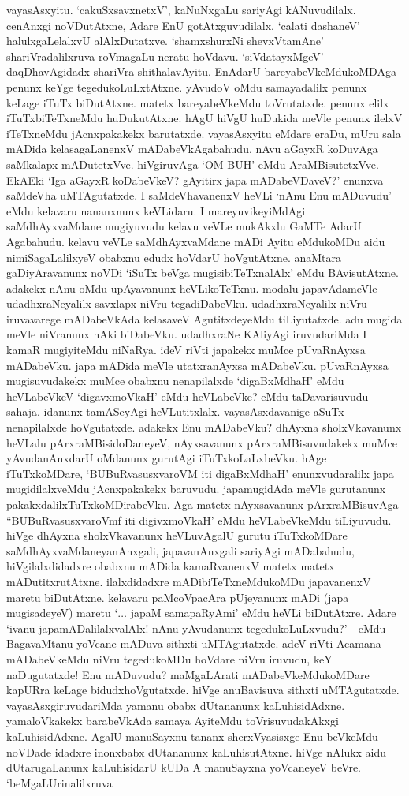 vayasAsxyitu. `cakuSxsavxnetxV', kaNuNxgaLu sariyAgi kANuvudilalx. cenAnxgi noVDutAtxne, Adare EnU gotAtxguvudilalx. `calati dashaneV' halulxgaLelalxvU alAlxDutatxve. `shamxshurxNi shevxVtamAne' shariVradalilxruva roVmagaLu neratu hoVdavu. `siVdatayxMgeV' daqDhavAgidadx shariVra shithalavAyitu. EnAdarU bareyabeVkeMdukoMDAga penunx keYge tegedukoLuLxtAtxne. yAvudoV oMdu samayadalilx penunx keLage iTuTx biDutAtxne. matetx bareyabeVkeMdu toVrutatxde. penunx elilx iTuTxbiTeTxneMdu huDukutAtxne. hAgU hiVgU huDukida meVle penunx ilelxV iTeTxneMdu jAcnxpakakekx barutatxde. vayasAsxyitu eMdare eraDu, mUru sala mADida kelasagaLanenxV mADabeVkAgabahudu. nAvu aGayxR koDuvAga saMkalapx mADutetxVve. hiVgiruvAga `OM BUH' eMdu AraMBisutetxVve. EkAEki `Iga aGayxR koDabeVkeV? gAyitirx japa mADabeVDaveV?' enunxva saMdeVha uMTAgutatxde. I saMdeVhavanenxV heVLi `nAnu Enu mADuvudu' eMdu kelavaru nananxnunx keVLidaru. I mareyuvikeyiMdAgi saMdhAyxvaMdane mugiyuvudu kelavu veVLe mukAkxlu GaMTe AdarU Agabahudu. kelavu veVLe saMdhAyxvaMdane mADi Ayitu eMdukoMDu aidu nimiSagaLalilxyeV obabxnu edudx hoVdarU hoVgutAtxne. anaMtara gaDiyAravanunx noVDi `iSuTx beVga mugisibiTeTxnalAlx' eMdu BAvisutAtxne. adakekx nAnu oMdu upAyavanunx heVLikoTeTxnu. modalu japavAdameVle udadhxraNeyalilx savxlapx niVru tegadiDabeVku. udadhxraNeyalilx niVru iruvavarege mADabeVkAda kelasaveV AgutitxdeyeMdu tiLiyutatxde. adu mugida meVle niVranunx hAki biDabeVku. udadhxraNe KAliyAgi iruvudariMda I kamaR mugiyiteMdu niNaRya. ideV riVti japakekx muMce pUvaRnAyxsa mADabeVku. japa mADida meVle utatxranAyxsa mADabeVku. pUvaRnAyxsa mugisuvudakekx muMce obabxnu nenapilalxde `digaBxMdhaH' eMdu heVLabeVkeV `digavxmoVkaH' eMdu heVLabeVke? eMdu taDavarisuvudu sahaja. idanunx tamASeyAgi heVLutitxlalx. vayasAsxdavanige aSuTx nenapilalxde hoVgutatxde. adakekx Enu mADabeVku? dhAyxna sholxVkavanunx heVLalu pArxraMBisidoDaneyeV, nAyxsavanunx pArxraMBisuvudakekx muMce yAvudanAnxdarU oMdanunx gurutAgi iTuTxkoLaLxbeVku. hAge iTuTxkoMDare, `BUBuRvasusxvaroVM iti digaBxMdhaH' enunxvudaralilx japa mugidilalxveMdu jAcnxpakakekx baruvudu. japamugidAda meVle gurutanunx pakakxdalilxTuTxkoMDirabeVku. Aga matetx nAyxsavanunx pArxraMBisuvAga ``BUBuRvasusxvaroVmf iti digivxmoVkaH' eMdu heVLabeVkeMdu tiLiyuvudu. hiVge dhAyxna sholxVkavanunx heVLuvAgalU gurutu iTuTxkoMDare saMdhAyxvaMdaneyanAnxgali, japavanAnxgali sariyAgi mADabahudu, hiVgilalxdidadxre obabxnu mADida kamaRvanenxV matetx matetx mADutitxrutAtxne. ilalxdidadxre mADibiTeTxneMdukoMDu japavanenxV maretu biDutAtxne. kelavaru paMcoVpacAra pUjeyanunx mADi (japa mugisadeyeV) maretu `$\ldots$ japaM samapaRyAmi' eMdu heVLi biDutAtxre. Adare `ivanu japamADalilalxvalAlx! nAnu yAvudanunx tegedukoLuLxvudu?' - eMdu BagavaMtanu yoVcane mADuva sithxti uMTAgutatxde. adeV riVti Acamana mADabeVkeMdu niVru tegedukoMDu hoVdare niVru iruvudu, keY naDugutatxde! Enu mADuvudu? maMgaLArati mADabeVkeMdukoMDare kapURra keLage bidudxhoVgutatxde. hiVge anuBavisuva sithxti uMTAgutatxde. vayasAsxgiruvudariMda yamanu obabx dUtananunx kaLuhisidAdxne. yamaloVkakekx barabeVkAda samaya AyiteMdu toVrisuvudakAkxgi kaLuhisidAdxne. AgalU manuSayxnu tananx sherxVyasisxge Enu beVkeMdu noVDade idadxre inonxbabx dUtananunx kaLuhisutAtxne. hiVge nAlukx aidu dUtarugaLanunx kaLuhisidarU kUDa A manuSayxna yoVcaneyeV beVre. `beMgaLUrinalilxruva 